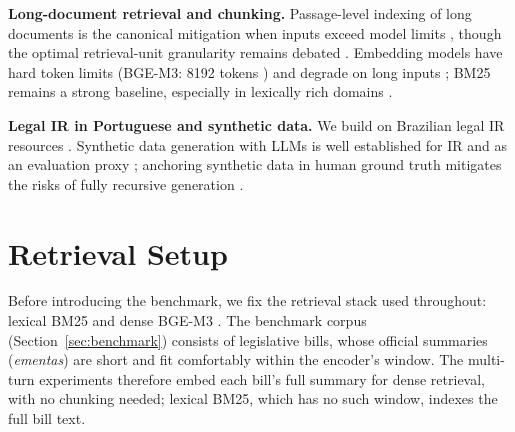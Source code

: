 \documentclass[conference]{IEEEtran}
\begin{document}
\textbf{Long-document retrieval and chunking.} Passage-level indexing of long
documents is the canonical mitigation when inputs exceed model limits
\cite{Dai2019Deeper,Karpukhin2020DPR}, though the optimal retrieval-unit
granularity remains debated \cite{Jiang2024LongRAG}. Embedding models have hard
token limits (BGE-M3: 8192 tokens \cite{Chen2024BGEM3}) and degrade on long inputs
\cite{Zhou2024LengthCollapse}; BM25 remains a strong baseline,
especially in lexically rich domains \cite{Robertson2009BM25,Thakur2021BEIR}.

\textbf{Legal IR in Portuguese and synthetic data.} We build on Brazilian legal
IR resources \cite{Vitorio2024,Fernandes2026JurisTCU,Pereira2026JUA,Junior2025BRTaxQA,LuzdeAraujo2018LeNERBr}.
Synthetic data generation with LLMs is well established for IR
\cite{Bonifacio2022InPars,Dai2023Promptagator} and as an evaluation proxy
\cite{Chiang2023Can}; anchoring synthetic data in human ground truth mitigates the
risks of fully recursive generation \cite{Shumailov2024Collapse}.

\section{Retrieval Setup}
\label{sec:foundation}
Before introducing the benchmark, we fix the retrieval stack used throughout:
lexical BM25 \cite{Robertson2009BM25} and dense BGE-M3 \cite{Chen2024BGEM3}. The
benchmark corpus (Section~\ref{sec:benchmark}) consists of legislative bills, whose
official summaries (\emph{ementas}) are short and fit comfortably within the
encoder's window. The multi-turn experiments therefore embed each bill's full
summary for dense retrieval, with no chunking needed; lexical BM25, which has no
such window, indexes the full bill text.
\end{document}
